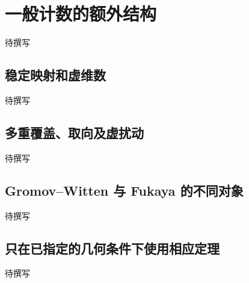 
% 
% 
% 

\section{一般计数的额外结构}
\label{g4:sec:2804}

待撰写

\subsection{稳定映射和虚维数}
\label{g4:subsec:2804:01}
待撰写

\subsection{多重覆盖、取向及虚扰动}
\label{g4:subsec:2804:02}
待撰写

\subsection{Gromov–Witten 与 Fukaya 的不同对象}
\label{g4:subsec:2804:03}
待撰写

\subsection{只在已指定的几何条件下使用相应定理}
\label{g4:subsec:2804:04}
待撰写
